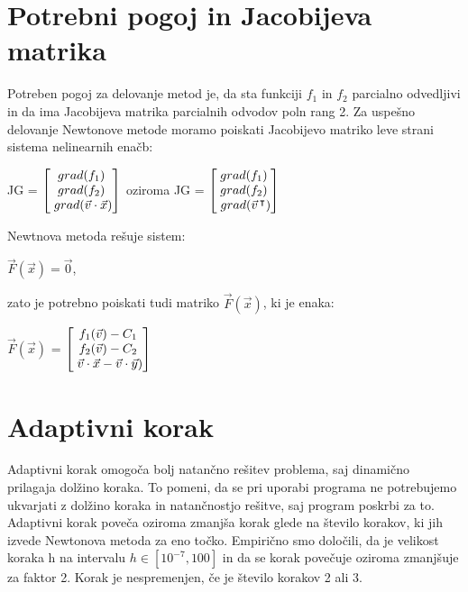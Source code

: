 \documentclass[12pt]{article}
\begin{document}
\newpage	
\section{Potrebni pogoj in Jacobijeva matrika}
	Potreben pogoj za delovanje metod je, da sta funkciji $f_{1}$ in $f_{2}$ parcialno odvedljivi in da ima Jacobijeva matrika parcialnih odvodov poln rang 2. Za uspešno delovanje Newtonove metode moramo poiskati Jacobijevo matriko leve strani sistema nelinearnih enačb:

	\begin{center}
		JG = $\begin{bmatrix}
		grad(f_{1}) \\
		grad(f_{2}) \\
		\hspace{1mm}grad(\vec{v} \cdot \vec{x}) \\
		\end{bmatrix}$
		oziroma
		JG = $\begin{bmatrix}
		grad(f_{1}) \\
		grad(f_{2}) \\
		\hspace{1mm}grad(\vec{v}\hspace{0.5mm}^\intercal) \\
		\end{bmatrix}$
	\end{center}
	Newtnova metoda rešuje sistem:
	\begin{center}
	    $\vec{F}(\vec{x}) = \vec{0}$,
	\end{center}
	zato je potrebno poiskati tudi matriko $\vec{F}(\vec{x})$, ki je enaka:
		\begin{center}
		$\vec{F}(\vec{x})$ = $\begin{bmatrix}
		f_{1}(\vec{v}) - C_{1} \\
		f_{2}(\vec{v}) - C_{2} \\
		\hspace{1mm}\vec{v} \cdot \vec{x} - \vec{v} \cdot \vec{y}) \\
		\end{bmatrix}$
	\end{center}

\section{Adaptivni korak}
    Adaptivni korak omogoča bolj natančno rešitev problema, saj dinamično prilagaja dolžino koraka. To pomeni, da se pri uporabi programa ne potrebujemo ukvarjati z dolžino koraka in natančnostjo rešitve, saj program poskrbi za to. Adaptivni korak poveča oziroma zmanjša korak glede na število korakov, ki jih izvede Newtonova metoda za eno točko. Empirično smo določili, da je velikost koraka h na intervalu $h\in[10^{-7},100]$ in da se korak povečuje oziroma zmanjšuje za faktor 2. Korak je nespremenjen, če je število korakov 2 ali 3.
	
\end{document}
